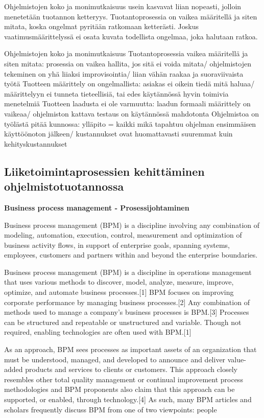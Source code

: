 \documentclass[finnish,12pt,a4paper,pdftex]{article}
\begin{document}
Ohjelmistojen koko ja monimutkaisuus usein kasvavat liian nopeasti, jolloin menetetään tuotannon ketteryys. Tuotantoprosessia on vaikea määritellä ja siten mitata, koska ongelmat pyritään ratkomaan ketterästi. Joskus vaatimusmäärittelyssä ei osata kuvata todellista ongelmaa, joka halutaan ratkoa. 

Ohjelmistojen koko ja monimutkaisuus
Tuotantoprosessia vaikea määritellä ja siten mitata: prosessia on vaikea hallita, jos sitä ei voida mitata/ ohjelmistojen tekeminen on yhä liiaksi improvisointia/ liian vähän raakaa ja suoraviivaista työtä
Tuotteen määrittely on ongelmallista: asiakas ei oikein tiedä mitä haluaa/ määrittelyyn ei tunneta tieteellisiä, tai edes käytännössä hyvin toimivia menetelmiä
Tuotteen laadusta ei ole varmuutta: laadun formaali määrittely on vaikeaa/ ohjelmiston kattava testaus on käytännössä mahdotonta
Ohjelmistoa on työlästä pitää kunnossa: ylläpito = kaikki mikä tapahtuu ohjelman ensimmäisen käyttöönoton jälkeen/ kustannukset ovat huomattavasti suuremmat kuin kehityskustannukset

\subsection{Liiketoimintaprosessien kehittäminen ohjelmistotuotannossa}

\textbf{Business process management - Prosessijohtaminen}

Business process management (BPM) is a discipline involving any combination of modeling, automation, execution, control, measurement and optimization of business activity flows, in support of enterprise goals, spanning systems, employees, customers and partners within and beyond the enterprise boundaries.

Business process management (BPM) is a discipline in operations management that uses various methods to discover, model, analyze, measure, improve, optimize, and automate business processes.[1] BPM focuses on improving corporate performance by managing business processes.[2] Any combination of methods used to manage a company's business processes is BPM.[3] Processes can be structured and repeatable or unstructured and variable. Though not required, enabling technologies are often used with BPM.[1]

As an approach, BPM sees processes as important assets of an organization that must be understood, managed, and developed to announce and deliver value-added products and services to clients or customers. This approach closely resembles other total quality management or continual improvement process methodologies and BPM proponents also claim that this approach can be supported, or enabled, through technology.[4] As such, many BPM articles and scholars frequently discuss BPM from one of two viewpoints: people
\end{document}

